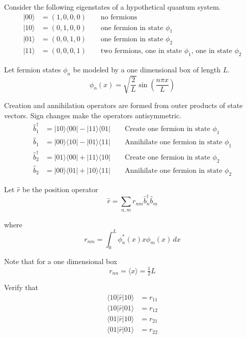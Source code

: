 \documentclass[12pt]{article}
\begin{document}
\noindent
Consider the following eigenstates of a hypothetical quantum system.
\begin{align*}
|00\rangle&=(1,0,0,0)\qquad\text{no fermions}\\
|10\rangle&=(0,1,0,0)\qquad\text{one fermion in state $\phi_1$}\\
|01\rangle&=(0,0,1,0)\qquad\text{one fermion in state $\phi_2$}\\
|11\rangle&=(0,0,0,1)\qquad\text{two fermions, one in state $\phi_1$, one in state $\phi_2$}
\end{align*}

\noindent
Let fermion states $\phi_n$ be modeled by a one dimensional box of length $L$.
\begin{equation*}
\phi_n(x)=\sqrt{\frac{2}{L}}\sin\left(\frac{n\pi x}{L}\right)
\end{equation*}

\noindent
Creation and annihilation operators are formed from outer products of state vectors.
Sign changes make the operators antisymmetric.
\begin{align*}
\hat{b}_1^\dag&=|10\rangle\langle00|-|11\rangle\langle01| \qquad\text{Create one fermion in state $\phi_1$}
\\
\hat{b}_1&=|00\rangle\langle10|-|01\rangle\langle11| \qquad\text{Annihilate one fermion in state $\phi_1$}
\\
\hat{b}_2^\dag&=|01\rangle\langle00|+|11\rangle\langle10| \qquad\text{Create one fermion in state $\phi_2$}
\\
\hat{b}_2&=|00\rangle\langle01|+|10\rangle\langle11| \qquad\text{Annihilate one fermion in state $\phi_2$}
\end{align*}

\noindent
Let $\hat{r}$ be the position operator
\begin{equation*}
\hat{r}=\sum_{n,m}r_{nm}\hat{b}_n^\dag\hat{b}_m
\end{equation*}

\noindent
where
\begin{equation*}
r_{nm}=\int_0^L\phi_n^*(x)x\phi_m(x)\,dx
\end{equation*}

\noindent
Note that for a one dimensional box
\begin{equation*}
r_{nn}=\langle x\rangle=\tfrac{1}{2}L
\end{equation*}

\noindent
Verify that
\begin{align*}
\langle10|\hat{r}|10\rangle&=r_{11}\\
\langle10|\hat{r}|01\rangle&=r_{12}\\
\langle01|\hat{r}|10\rangle&=r_{21}\\
\langle01|\hat{r}|01\rangle&=r_{22}
\end{align*}
\end{document}
